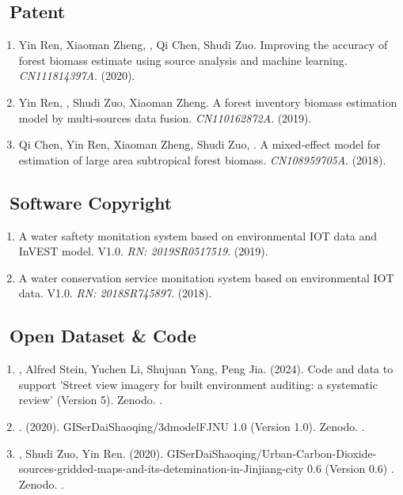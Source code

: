 \subsection*{\texorpdfstring{\faBook\ Patent}{Patent}}
\begin{enumerate}
\item
     Yin Ren, Xiaoman Zheng, \Shaoqing, Qi Chen, Shudi Zuo.
     Improving the accuracy of forest biomass estimate using source analysis and machine learning.
     \textit{CN111814397A}. (2020).
\item
     Yin Ren, \Shaoqing, Shudi Zuo, Xiaoman Zheng.
     A forest inventory biomass estimation model by multi-sources data fusion.
     \textit{CN110162872A}. (2019).
\item
     Qi Chen, Yin Ren, Xiaoman Zheng, Shudi Zuo, \Shaoqing.
     A mixed-effect model for estimation of large area subtropical forest biomass.
     \textit{CN108959705A}. (2018).
\end{enumerate}

\subsection*{\texorpdfstring{\faBook\ Software Copyright}{Software Copyright}}
\begin{enumerate}
\item
    A water saftety monitation system based on environmental IOT data and InVEST model. V1.0.
    \textit{RN: 2019SR0517519}. (2019).
\item
    A water conservation service monitation system based on environmental IOT data. V1.0.
    \textit{RN: 2018SR745897}. (2018).
\end{enumerate}

\subsection*{\texorpdfstring{\faBook\ Open Dataset \& Code}{Open Dataset \& Code}}
\begin{enumerate}
\item
   \Shaoqing, Alfred Stein, Yuchen Li, Shujuan Yang, Peng Jia. (2024).
    Code and data to support 'Street view imagery for built environment auditing: a systematic review'  (Version 5). Zenodo. 
    .
\item
   \Shaoqing. (2020).
    GISerDaiShaoqing/3dmodelFJNU 1.0 (Version 1.0). Zenodo. 
    .
\item
   \Shaoqing, Shudi Zuo, Yin Ren. (2020).
    GISerDaiShaoqing/Urban-Carbon-Dioxide-sources-gridded-maps-and-its-detemination-in-Jinjiang-city 0.6 (Version 0.6) . Zenodo. 
    .
\end{enumerate}